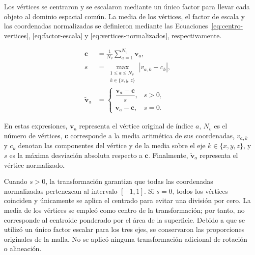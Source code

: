Los vértices se centraron y se escalaron mediante un único factor para llevar cada objeto al dominio espacial común. La media de los vértices, el factor de escala y las coordenadas normalizadas se definieron mediante las Ecuaciones~\eqref{eq:centro-vertices}, \eqref{eq:factor-escala} y \eqref{eq:vertices-normalizados}, respectivamente.

\begin{subequations}\label{eq:normalizacion}
\begin{align}
\mathbf c
&=
\frac{1}{N_v}
\sum_{a=1}^{N_v}\mathbf v_a,
\label{eq:centro-vertices}\\
s
&=
\max_{\substack{1\leq a\leq N_v\\k\in\{x,y,z\}}}
\left|v_{a,k}-c_k\right|,
\label{eq:factor-escala}\\
\widetilde{\mathbf v}_a
&=
\begin{cases}
\dfrac{\mathbf v_a-\mathbf c}{s}, & s>0,\\[2mm]
\mathbf v_a-\mathbf c, & s=0.
\end{cases}
\label{eq:vertices-normalizados}
\end{align}
\end{subequations}

En estas expresiones, $\mathbf v_a$ representa el vértice original de índice $a$, $N_v$ es el número de vértices, $\mathbf c$ corresponde a la media aritmética de sus coordenadas, $v_{a,k}$ y $c_k$ denotan las componentes del vértice y de la media sobre el eje $k\in\{x,y,z\}$, y $s$ es la máxima desviación absoluta respecto a $\mathbf c$. Finalmente, $\widetilde{\mathbf v}_a$ representa el vértice normalizado.

Cuando $s>0$, la transformación garantiza que todas las coordenadas normalizadas pertenezcan al intervalo $[-1,1]$. Si $s=0$, todos los vértices coinciden y únicamente se aplica el centrado para evitar una división por cero. La media de los vértices se empleó como centro de la transformación; por tanto, no corresponde al centroide ponderado por el área de la superficie. Debido a que se utilizó un único factor escalar
para los tres ejes, se conservaron las proporciones originales de la malla. No se aplicó ninguna transformación adicional de rotación o alineación.

